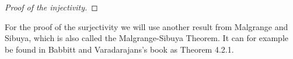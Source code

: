 \begin{proof}[Proof of the injectivity]
\begin{comment}
      $f_j$,$f_j'$ are defined on $U_j$.
      Since $[(f_lf_j^{-1})]=[(f_l'f_j'^{-1})]$ there exists a $0$-cochain
      $(g_j)$ of the sheaf $\Aut^{<0}(\tilde\cM^{nf})$ relative to the covering
      $(I_j)$, such that
      \[
        f_l'f_j'^{-1}=g_lf_lf_j^{-1}g_j^{-1} \text{ on } I_j\cap I_l.
      \]
      If we set $\sigma=f_j^{-1}g_{j}^{-1}f_j'$ on $I_{j}$, we get a horizontal
      section\TODO[~on~???], thus\TODO[why?] it satisfies
      $\sigma\circ\hat{f'}=\hat f$. Therefore are $(\cM,\nabla,\hat f)$ and
      $(\cM',\nabla',\hat{f'})$ isomorphic and injectivity is proven.
    \end{comment}
  \fi
\end{proof}

For the proof of the surjectivity we will use another result from Malgrange and
Sibuya, which is also called the Malgrange-Sibuya Theorem. It can for example
be found in Babbitt and Varadarajans's book \cite[65ff]{babbitt1989local} as
Theorem 4.2.1.

